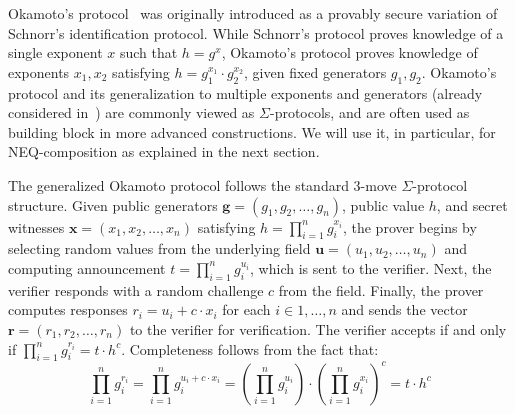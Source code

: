 \documentclass[sigconf, anonymous]{acmart}
\begin{document}
Okamoto's protocol~\cite[Identification scheme 1]{okamoto1992provably} was originally introduced as a provably secure variation of Schnorr's identification protocol.
While Schnorr's protocol proves knowledge of a single exponent $x$ such that $h = g^x$, Okamoto's protocol proves knowledge of 
exponents $x_1, x_2$ satisfying $h = g_1^{x_1} \cdot g_2^{x_2}$, given fixed generators $g_1,g_2$. Okamoto's protocol and its generalization to multiple exponents and generators
(already considered in~\cite{10.1007/3-540-39118-5_13}) are commonly viewed as $\Sigma$-protocols, and are often used as building block in more advanced constructions.
We will use it, in particular, for NEQ-composition as explained in the next section.

The generalized Okamoto protocol follows the standard 3-move $\Sigma$-protocol structure. Given public generators $\mathbf{g} = (g_1, g_2, \ldots, g_n)$, public value $h$, and secret witnesses $\mathbf{x} = (x_1, x_2, \ldots, x_n)$ satisfying $h = \prod_{i=1}^{n} g_i^{x_i}$, the prover begins by selecting random values from the underlying field $\mathbf{u} = (u_1, u_2, \ldots, u_n)$ and computing announcement $t = \prod_{i=1}^{n} g_i^{u_i}$, which is sent to the verifier. Next, the verifier responds with a random challenge $c$ from the field. Finally, the prover computes responses $r_i = u_i + c \cdot x_i$ for each $i \in {1, \ldots, n}$ and sends the vector $\mathbf{r} = (r_1, r_2, \ldots, r_n)$ to the verifier for verification. The verifier accepts if and only if 
$\prod_{i=1}^{n} g_i^{r_i} = t \cdot h^c$. Completeness follows from the fact that:
\[
\prod_{i=1}^{n} g_i^{r_i} = \prod_{i=1}^{n} g_i^{u_i + c \cdot x_i} = 
\left(\prod_{i=1}^{n} g_i^{u_i}\right) \cdot \left(\prod_{i=1}^{n} g_i^{x_i}\right)^c = t \cdot h^c
\]
\end{document}
